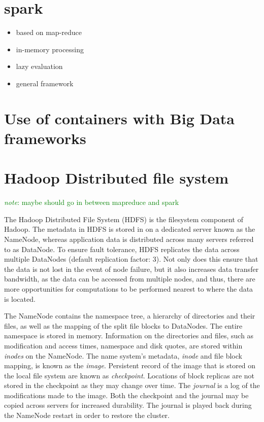 \documentclass{report}
\newcommand{\note}[1]{\textcolor{green}{\textit{note}: #1}}
\begin{document}
    \section{spark} 
        \begin{itemize} 
            \item based on map-reduce 
            \item in-memory processing 
            \item lazy evaluation 
            \item general framework 
        \end{itemize} 
     \section{Use of containers with Big Data frameworks}
     \section{Hadoop Distributed file system} 
        \note{maybe should go in between mapreduce and spark} 

        The Hadoop Distributed File System (HDFS)\cite{hadoop} 
        is the filesystem component of Hadoop. The metadata in 
        HDFS is stored in on a dedicated server known as the 
        NameNode, whereas application data is distributed across 
        many servers referred to as DataNode. To ensure fault 
        tolerance, HDFS replicates the data across multiple 
        DataNodes (default replication factor: 3). Not only does 
        this ensure that the data is not lost in the event of node
        failure, but it also increases data transfer bandwidth, as
        the data can be accessed from multiple nodes, and thus, 
        there are more opportunities for computations to be 
        performed nearest to where the data is located. 

        The NameNode contains the namespace tree, a hierarchy of 
        directories and their files, as well as the mapping of the 
        split file blocks to DataNodes. The entire namespace is 
        stored in memory. Information on the directories and files,
        such as modification and access times, namespace and disk 
        quotes, are stored within \textit{inodes} on the NameNode. 
        The name system's metadata, \textit{inode} and file block 
        mapping, is known as the \textit{image}. Persistent record 
        of the image that is stored on the local file system are 
        known as \textit{checkpoint}. Locations of block replicas 
        are not stored in the checkpoint as they may change over 
        time. The \textit{journal} is a log of the modifications 
        made to the image. Both the checkpoint and the journal may 
        be copied across servers for increased durability. The 
        journal is played back during the NameNode restart in order 
        to restore the cluster.
\end{document}
